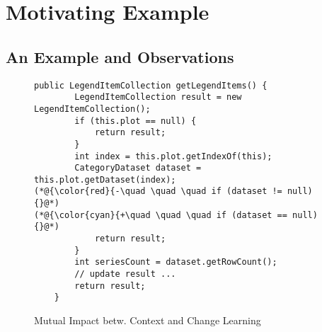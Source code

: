 \section{Motivating Example}
\label{motiv:sec}

\subsection{An Example and Observations}

\begin{figure}[t]
	\centering
	\begin{lstlisting}[]
    public LegendItemCollection getLegendItems() {
        LegendItemCollection result = new LegendItemCollection();
        if (this.plot == null) {
            return result;
        }
        int index = this.plot.getIndexOf(this);
        CategoryDataset dataset = this.plot.getDataset(index);
(*@{\color{red}{-\quad \quad \quad if (dataset != null) {}@*)
(*@{\color{cyan}{+\quad \quad \quad if (dataset == null) {}@*)
            return result;
        }
        int seriesCount = dataset.getRowCount();
        // update result ...
        return result;
    }
	\end{lstlisting}
        \vspace{-15pt}
        \caption{Mutual Impact betw. Context and Change Learning}
        \vspace{-8pt}
        \label{fig:motiv}
\end{figure}


